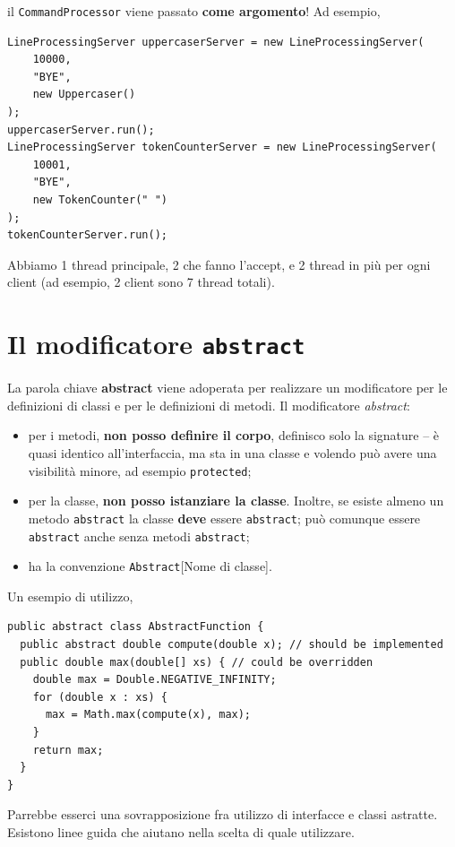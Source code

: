 \documentclass[\fontsizeclass,twocolumn]{\classname}
\theoremstyle{definition}
\theoremstyle{definition}
\begin{document}
il \texttt{CommandProcessor} viene passato \textbf{come argomento}! Ad esempio,

\begin{lstlisting}
LineProcessingServer uppercaserServer = new LineProcessingServer(
    10000,
    "BYE",
    new Uppercaser()
);
uppercaserServer.run();
LineProcessingServer tokenCounterServer = new LineProcessingServer(
    10001,
    "BYE",
    new TokenCounter(" ")
);
tokenCounterServer.run();
\end{lstlisting}

Abbiamo 1 thread principale, 2 che fanno l'accept, e 2 thread in più per ogni
client (ad esempio, 2 client sono 7 thread totali).

\section{Il modificatore \texttt{abstract}}

La parola chiave \textbf{abstract} viene adoperata per realizzare un modificatore per le definizioni di classi e per le definizioni di metodi. Il modificatore \emph{abstract}:
\begin{itemize}
    \item per i metodi, \textbf{non posso definire il corpo}, definisco solo la
        signature -- è quasi identico all'interfaccia, ma sta in una classe e
        volendo può avere una visibilità minore, ad esempio \texttt{protected};
    \item per la classe, \textbf{non posso istanziare la classe}. Inoltre, se
        esiste almeno un metodo \texttt{abstract} la classe \textbf{deve}
        essere \texttt{abstract}; può comunque essere \texttt{abstract} anche
        senza metodi \texttt{abstract};
    \item ha la convenzione \texttt{Abstract}[Nome di classe].
\end{itemize}

Un esempio di utilizzo,

\begin{lstlisting}
public abstract class AbstractFunction {
  public abstract double compute(double x); // should be implemented
  public double max(double[] xs) { // could be overridden
    double max = Double.NEGATIVE_INFINITY;
    for (double x : xs) {
      max = Math.max(compute(x), max);
    }
    return max;
  }
}
\end{lstlisting}

Parrebbe esserci una sovrapposizione fra utilizzo di interfacce e classi
astratte. Esistono linee guida che aiutano nella scelta di quale utilizzare. 
\end{document}
